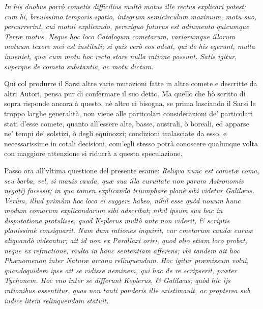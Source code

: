 \documentclass[11pt,twoside,openany]{book}
\begin{document}
\textit{In his duobus porrò cometis difficilius multò motus ille rectus explicari potest; cum hi, breuissimo temporis spatio, integrum semicirculum maximum, motu suo, percurrerint, cui motui explicando, perexiguo futurus est adiumento quicumque Terræ motus. Neque hoc loco Catalogum cometarum, variorumque illorum motuum texere mei est instituti; si quis verò eos adeat, qui de his egerunt, multa inueniet, quæ cum motu hoc recto stare nulla ratione possunt. Satis igitur, superque de cometa substantia, ac motu dictum.}


Quì col produrre il Sarsi altre varie mutazioni fatte in altre comete e descritte da altri Autori, pensa pur di confermare il suo detto. Ma quello che hò scritto di sopra risponde ancora à questo, nè altro ci bisogna, se prima lasciando il Sarsi le troppo larghe generalità, non viene alle particolari considerazioni de' particolari stati d'esse comete, quanto all'essere alte, basse, australi, ò boreali, ed apparse ne' tempi de' solstizi, ò degli equinozzi; condizioni tralasciate da esso, e necessarissime in cotali decisioni, com'egli stesso potrà conoscere qualunque volta con maggiore attenzione si ridurrà a questa speculazione.



\par\bigskip\noindent{}\enspace Passo ora all'vltima questione del presente esame: \textit{Reliqva nunc est cometæ coma, seu barba, vel, si mauis cauda, quæ sua illa curuitate non parum Astronomis negotij facessit; in qua tamen explicanda triumphare planè sibi videtur Galilæus. Verùm, illud primùm hoc loco ei suggere habeo, nihil esse quòd nouum hunc modum comarum explicandarum sibi adscribat; nihil ipsum sua hac in disputatione protulisse, quod Keplerus multò ante non viderit, \& scriptis planissimè consignarit. Nam dum rationes inquirit, cur cmetarum caudæ curuæ aliquandò videantur; ait id non ex Parallaxi oriri, quod alio etiam loco probat, neque ex refractione, multa in hanc sententiam afferens; vbi tandem ait hoc Phænomenon inter Naturæ arcana relinquendum. }\textit{Hoc igitur præmissum volui, quandoquidem ipse ait se vidisse neminem, qui hac de re scripserit, præter }\textit{Tychonem. Hoc vno inter se differunt Keplerus, \& Galilæus; quòd hic ijs rationibus assentitur, quas non tanti ponderis ille existimauit, ac propterea sub iudice litem relinquendam statuit.}
\end{document}
